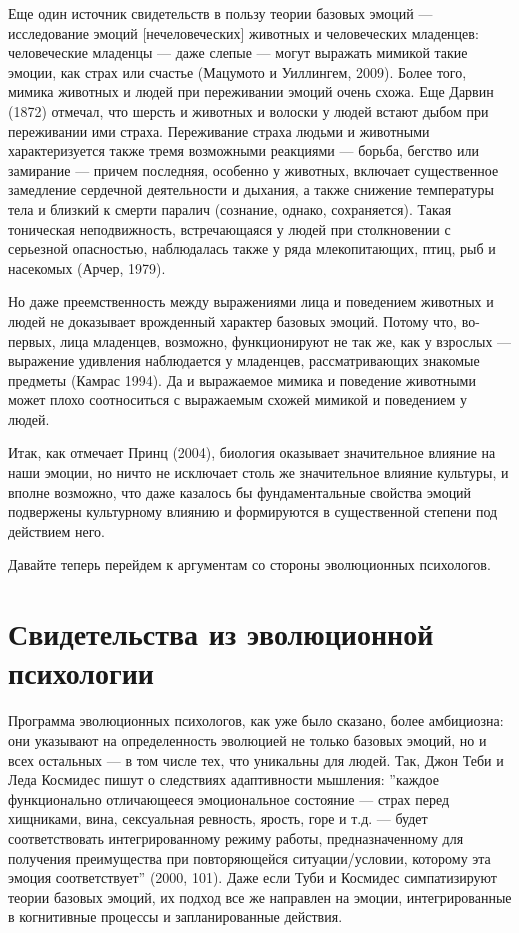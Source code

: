 \documentclass[11pt]{book}
\begin{document}
Еще один источник свидетельств в пользу теории базовых эмоций --- исследование эмоций [нечеловеческих] животных и человеческих младенцев: человеческие младенцы --- даже слепые --- могут выражать мимикой такие эмоции, как страх или счастье (Мацумото и Уиллингем, 2009). Более того, мимика животных и людей при переживании эмоций очень схожа. Еще Дарвин (1872) отмечал, что шерсть и животных и волоски у людей встают дыбом при переживании ими страха. Переживание страха людьми и животными характеризуется также тремя возможными реакциями --- борьба, бегство или замирание --- причем последняя, особенно у животных, включает существенное замедление сердечной деятельности и дыхания, а также снижение температуры тела и близкий к смерти паралич (сознание, однако, сохраняется). Такая тоническая неподвижность, встречающаяся у людей при столкновении с серьезной опасностью, наблюдалась также у ряда млекопитающих, птиц, рыб и насекомых (Арчер, 1979).

Но даже преемственность между выражениями лица и поведением животных и людей не доказывает врожденный характер базовых эмоций. Потому что, во-первых, лица младенцев, возможно, функционируют не так же, как у взрослых --- выражение удивления наблюдается у младенцев, рассматривающих знакомые предметы (Камрас 1994). Да и выражаемое мимика и поведение животными может плохо соотноситься с выражаемым схожей мимикой и поведением у людей.

Итак, как отмечает Принц (2004), биология оказывает значительное влияние на наши эмоции, но ничто не исключает столь же значительное влияние культуры, и вполне возможно, что даже казалось бы фундаментальные свойства эмоций подвержены культурному влиянию и формируются в существенной степени под действием него.

Давайте теперь перейдем к аргументам со стороны эволюционных психологов.

\section{Свидетельства из эволюционной психологии}

Программа эволюционных психологов, как уже было сказано, более амбициозна: они указывают на определенность эволюцией не только базовых эмоций, но и всех остальных --- в том числе тех, что уникальны для людей. Так, Джон Теби и Леда Космидес пишут о следствиях адаптивности мышления: ''каждое функционально отличающееся эмоциональное состояние --- страх перед хищниками, вина, сексуальная ревность, ярость, горе и т.д. --- будет соответствовать интегрированному режиму работы, предназначенному для получения преимущества при повторяющейся ситуации/условии, которому эта эмоция соответствует'' (2000, 101). Даже если Туби и Космидес симпатизируют теории базовых эмоций, их подход все же направлен на эмоции, интегрированные в когнитивные процессы и запланированные действия.
\end{document}
